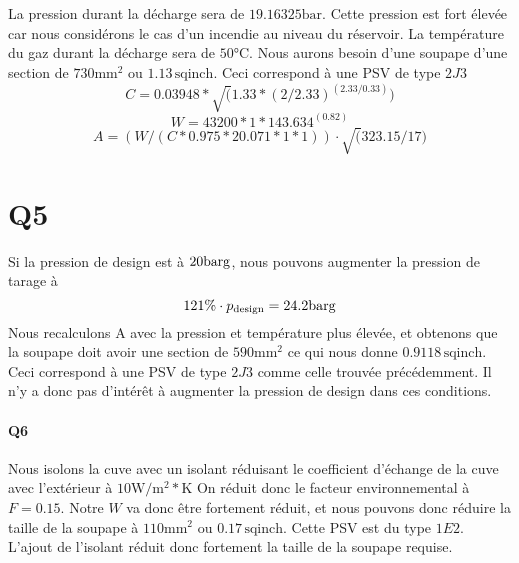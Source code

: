 \section{} 
La pression durant la décharge sera de $19.16325 \si{\bar}$. 
Cette pression est fort élevée car nous considérons le cas d'un incendie au niveau du réservoir. 
La température du gaz durant la décharge sera de $50\si{\celsius}$. 
Nous aurons besoin d'une soupape d'une section de $730\si{\milli\meter\squared}$ 
ou $1.13 \, \text{sqinch}$. Ceci correspond à une PSV de type $2J3$
\[ C = 0.03948 * \sqrt(1.33 * (2 / 2.33)^(2.33 / 0.33)) \]
\[ W = 43200 * 1 * 143.634^(0.82) \]
\[ A = (W / (C * 0.975 * 20.071 * 1 * 1)) \cdot \sqrt(323.15/17) \]

\section{Q5} 
Si la pression de design est à $20\si{\bar}\text{g}$, nous pouvons augmenter la pression de tarage à \[ 121\% \cdot p_{\text{design}} = 24.2\si{\bar}\text{g} \]
Nous recalculons A avec la pression et température plus élevée, et obtenons que la soupape doit avoir une section de $590\si{\milli\meter\squared}$
ce qui nous donne $0.9118 \, \text{sqinch}$. Ceci correspond à une PSV de type $2J3$ comme celle trouvée précédemment. Il n'y a donc pas d'intérêt
à augmenter la pression de design dans ces conditions.

\paragraph{Q6}
Nous isolons la cuve avec un isolant réduisant le coefficient d'échange de la cuve avec l'extérieur à 
$10 \si{\watt}/\si{\meter\squared}*\si{\kelvin}$
On réduit donc le facteur environnemental à $F = 0.15$. 
Notre $W$ va donc être fortement réduit, et nous pouvons donc réduire la taille de la soupape à 
$110\si{\milli\meter\squared}$ ou $0.17 \, \text{sqinch}$. Cette PSV est du type $1E2$. L'ajout de l'isolant réduit donc fortement la taille de
la soupape requise.

